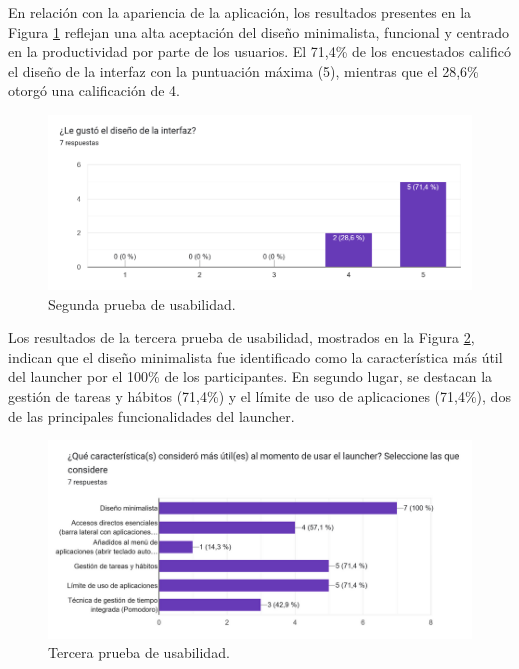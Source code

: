 En relación con la apariencia de la aplicación, los resultados presentes en la Figura \ref{fig:interfaz_agradable} reflejan una alta aceptación del diseño minimalista, funcional y centrado en la productividad por parte de los usuarios. El 71,4\% de los encuestados calificó el diseño de la interfaz con la puntuación máxima (5), mientras que el 28,6\% otorgó una calificación de 4.

\begin{figure}[h]
  \caption{Segunda prueba de usabilidad.}
  \label{fig:interfaz_agradable}
  \includegraphics[width=\textwidth]{Figuras/interfaz_agradable.png}
  \centering
\end{figure}

Los resultados de la tercera prueba de usabilidad, mostrados en la Figura \ref{fig:mejores_caracteristicas}, indican que el diseño minimalista fue identificado como la característica más útil del launcher por el 100\% de los participantes. En segundo lugar, se destacan la gestión de tareas y hábitos (71,4\%) y el límite de uso de aplicaciones (71,4\%), dos de las principales funcionalidades del launcher. 

\begin{figure}[h]
  \caption{Tercera prueba de usabilidad.}
  \label{fig:mejores_caracteristicas}
  \includegraphics[width=\textwidth]{Figuras/mejores_caracteristicas.png}
  \centering
\end{figure}


